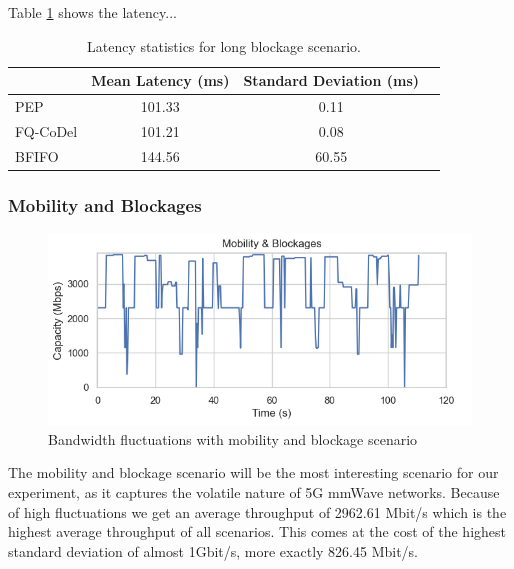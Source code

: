 \documentclass[a4paper,english, 11pt]{report}
\begin{document}
Table \ref{tab:throughput_latency_lb} shows the latency...

\begin{table}[h!]
\centering
\begin{tabular}{l|c|c|c}
\hline
 & \textbf{Mean Latency (ms)} & \textbf{Standard Deviation (ms)} \\
\hline
PEP   & 101.33 & 0.11 \\
FQ-CoDel  &  101.21 & 0.08 \\
BFIFO & 144.56 & 60.55\\
\end{tabular}
\caption{Latency statistics for long blockage scenario.}
\label{tab:throughput_latency_lb}
\end{table}

\subsubsection{Mobility and Blockages}
\label{sec:mobb}

\begin{figure}[h!] %
	\centering
	\includegraphics[scale=0.60]{../diagrams/witestlab/mobb.png}
  	\caption{Bandwidth fluctuations with mobility and blockage scenario}
  	\label{fig:mobb_fluctuations}
\end{figure}

The mobility and blockage scenario will be the most interesting scenario for our experiment, as it captures the volatile nature of 5G mmWave networks. Because of high fluctuations we get an average throughput of 2962.61 Mbit/s which is the highest average throughput of all scenarios. This comes at the cost of the highest standard deviation of almost 1Gbit/s, more exactly 826.45 Mbit/s.\\
\end{document}
